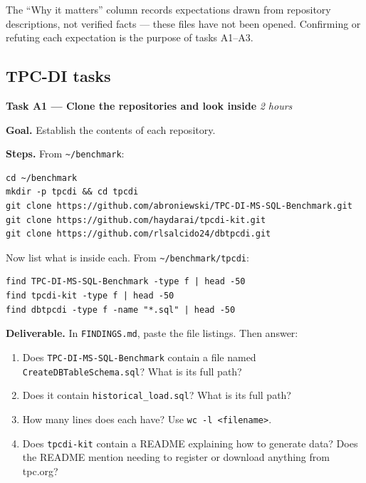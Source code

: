 \documentclass[11pt,a4paper]{article}
\newcommand{\code}[1]{\texttt{\small #1}}
\begin{document}
\begin{warnbox}
The ``Why it matters'' column records expectations drawn from repository descriptions,
not verified facts --- these files have not been opened. Confirming or refuting each
expectation is the purpose of tasks A1--A3.
\end{warnbox}

\subsection{TPC-DI tasks}

\begin{taskbox}
\textbf{Task A1 --- Clone the repositories and look inside} \hfill \emph{2 hours}
\end{taskbox}

\textbf{Goal.} Establish the contents of each repository.

\textbf{Steps.} From \code{\textasciitilde/benchmark}:

\begin{lstlisting}[style=sh]
cd ~/benchmark
mkdir -p tpcdi && cd tpcdi
git clone https://github.com/abroniewski/TPC-DI-MS-SQL-Benchmark.git
git clone https://github.com/haydarai/tpcdi-kit.git
git clone https://github.com/rlsalcido24/dbtpcdi.git
\end{lstlisting}

Now list what is inside each. From \code{\textasciitilde/benchmark/tpcdi}:

\begin{lstlisting}[style=sh]
find TPC-DI-MS-SQL-Benchmark -type f | head -50
find tpcdi-kit -type f | head -50
find dbtpcdi -type f -name "*.sql" | head -50
\end{lstlisting}

\textbf{Deliverable.} In \code{FINDINGS.md}, paste the file listings. Then answer:

\begin{enumerate}
\item Does \code{TPC-DI-MS-SQL-Benchmark} contain a file named
  \code{CreateDBTableSchema.sql}? What is its full path?
\item Does it contain \code{historical\_load.sql}? What is its full path?
\item How many lines does each have? Use \code{wc -l \textless filename\textgreater}.
\item Does \code{tpcdi-kit} contain a README explaining how to generate data? Does the
  README mention needing to register or download anything from tpc.org?
\end{enumerate}
\end{document}
